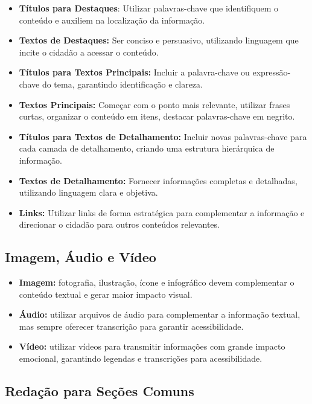 \documentclass[
  12pt,
  openright,
  twoside,
  a4paper,
  english,
  french,
  spanish,
  brazil
]{abntex2}
\begin{document}
\begin{itemize}
  \item \textbf{Títulos para Destaques}: Utilizar palavras-chave que identifiquem o conteúdo e auxiliem na localização da informação.
  \item \textbf{Textos de Destaques:} Ser conciso e persuasivo, utilizando linguagem que incite o cidadão a acessar o conteúdo.
  \item \textbf{Títulos para Textos Principais:} Incluir a palavra-chave ou expressão-chave do tema, garantindo identificação e clareza.
  \item \textbf{Textos Principais:} Começar com o ponto mais relevante, utilizar frases curtas, organizar o conteúdo em itens, destacar palavras-chave em negrito.
  \item \textbf{Títulos para Textos de Detalhamento:} Incluir novas palavras-chave para cada camada de detalhamento, criando uma estrutura hierárquica de informação.
  \item \textbf{Textos de Detalhamento:} Fornecer informações completas e detalhadas, utilizando linguagem clara e objetiva.
  \item \textbf{Links:} Utilizar links de forma estratégica para complementar a informação e direcionar o cidadão para outros conteúdos relevantes.
\end{itemize}

\subsection{Imagem, Áudio e Vídeo}

\begin{itemize}
  \item \textbf{Imagem:} fotografia, ilustração, ícone e infográfico devem complementar o conteúdo textual e gerar maior impacto visual.
  \item \textbf{Áudio:} utilizar arquivos de áudio para complementar a informação textual, mas sempre oferecer transcrição para garantir acessibilidade.
  \item \textbf{Vídeo:} utilizar vídeos para transmitir informações com grande impacto emocional, garantindo legendas e transcrições para acessibilidade.
\end{itemize}

\subsection{Redação para Seções Comuns}
\end{document}
